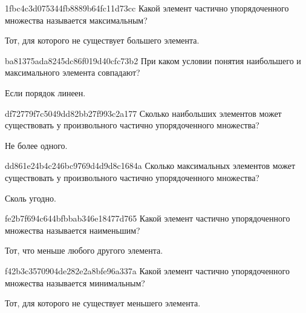 \begin{note}{1fbc4c3d075344fb8889b64fc11d73cc}
    Какой элемент частично упорядоченного множества называется максимальным?

    \begin{cloze}{1}
        Тот, для которого не существует большего элемента.
    \end{cloze}
\end{note}

\begin{note}{ba81375ada8245dc86f019d40cfc73b2}
    При каком условии понятия наибольшего и максимального элемента совпадают?

    \begin{cloze}{1}
        Если порядок линеен.
    \end{cloze}
\end{note}

\begin{note}{df72779f7c5049dd82bb27f993c2a177}
    Сколько наибольших элементов может существовать у произвольного частично упорядоченного множества?

    \begin{cloze}{1}
        Не более одного.
    \end{cloze}
\end{note}

\begin{note}{dd861e24b4c246bc9769d4d9d8c1684a}
    Сколько максимальных элементов может существовать у произвольного частично упорядоченного множества?

    \begin{cloze}{1}
        Сколь угодно.
    \end{cloze}
\end{note}

\begin{note}{fe2b7f694c644bfbbab346e18477d765}
    Какой элемент частично упорядоченного множества называется наименьшим?

    \begin{cloze}{1}
        Тот, что меньше любого другого элемента.
    \end{cloze}
\end{note}

\begin{note}{f42b3c3570904de282e2a8bfe96a337a}
    Какой элемент частично упорядоченного множества называется минимальным?

    \begin{cloze}{1}
        Тот, для которого не существует меньшего элемента.
    \end{cloze}
\end{note}

